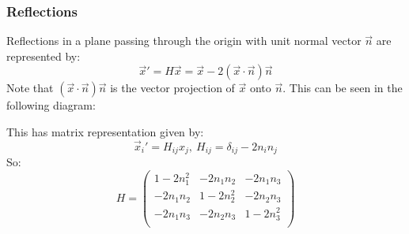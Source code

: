 \documentclass[../main.tex]{subfiles}
\begin{document}
\subsubsection{Reflections}
Reflections in a plane passing through the origin with unit normal vector $\vec{n}$ are represented by:
\[
  \vec{x}' = H\vec{x} = \vec{x} - 2(\vec{x} \cdot \vec{n})\vec{n}
\]
Note that $(\vec{x} \cdot \vec{n})\vec{n}$ is the vector projection of $\vec{x}$ onto $\vec{n}$.
This can be seen in the following diagram:
\begin{center}
\end{center}
This has matrix representation given by:
\[
  \vec{x}_i' = H_{i j}x_j,\ H_{i j} = \delta_{i j} - 2n_in_j
\]
So:
\[
  H = \begin{pmatrix}
  1-2n^{2}_{1} & -2n_1n_2 & -2n_1n_3 \\
  -2n_1n_2 & 1-2n^{2}_{2} & -2n_2n_3 \\
  -2n_1n_3 & -2n_2n_3 & 1-2n^{2}_{3} \\
  \end{pmatrix}
\]
\end{document}
